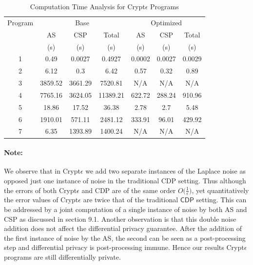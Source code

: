 \begin{table}[ht]
\caption{Computation Time Analysis for Crypt$\epsilon$ Programs}
\centering
\begin{tabular}{c c c c c c c}
\toprule
Program &  \multicolumn{3}{c}{Base} & \multicolumn{3}{c}{Optimized} \\ 
 & AS &  CSP & Total & AS & CSP & Total \\ &(s)&(s)&(s)&(s)&(s)&(s)\\ %
\midrule
1 & 0.49& 0.0027& 0.4927 & 0.0002 &0.0027 & 0.0029 \\
2 &  6.12 & 0.3  &6.42 &0.57&0.32& 0.89\\ %
3&  3859.52 & 3661.29 & 7520.81&N/A&N/A &N/A \\4  &7765.16&3624.05&11389.21&622.72&288.24& 910.96\\5&18.86&17.52&36.38&2.78&2.7&5.48\\6&1910.01&571.11&2481.12&333.91&96.01&429.92\\7&6.35 & 1393.89 & 1400.24 &  N/A & N/A & N/A\\ [1ex]
\bottomrule
\end{tabular}
\label{c}
\end{table}

\paragraph{\textbf{Note:}} We observe that in Crypt$\epsilon$ we add two separate instances of the Laplace noise as opposed just one instance of noise in the traditional \textsf{CDP} setting. Thus although the errors of both Crypt$\epsilon$ and \textsf{CDP} are of the same order $O\big(\frac{1}{\epsilon}\big)$, yet quantitatively the error values of Crypt$\epsilon$ are twice that of the traditional $\textsf{CDP}$ setting. This can be addressed by a joint computation of a single instance of noise by both \textsf{AS} and \textsf{CSP} as discussed in section 9.1. Another observation is that this double noise addition does not affect the differential privacy guarantee. After the addition of the first instance of noise by the \textsf{AS}, the second can be seen as a post-processing step and differential privacy is post-processing immune. Hence our results Crypt$\epsilon$ programs are still differentially private.


